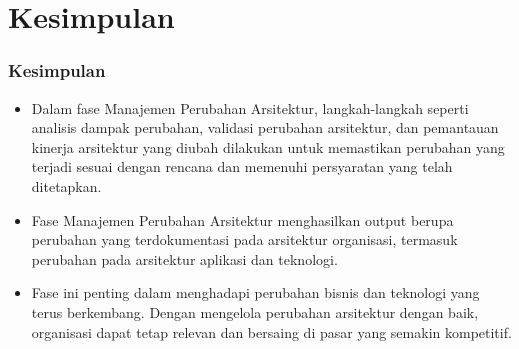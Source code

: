 \documentclass{beamer}
\begin{document}
\section{Kesimpulan}
\begin{frame}
	\frametitle{Kesimpulan}
	\begin{itemize}
	
	\item Dalam fase Manajemen Perubahan Arsitektur, langkah-langkah seperti analisis dampak perubahan, validasi perubahan arsitektur, dan pemantauan kinerja arsitektur yang diubah dilakukan untuk memastikan perubahan yang terjadi sesuai dengan rencana dan memenuhi persyaratan yang telah ditetapkan.
	
	\item Fase Manajemen Perubahan Arsitektur menghasilkan output berupa perubahan yang terdokumentasi pada arsitektur organisasi, termasuk perubahan pada arsitektur aplikasi dan teknologi.
	
	\item Fase ini penting dalam menghadapi perubahan bisnis dan teknologi yang terus berkembang. Dengan mengelola perubahan arsitektur dengan baik, organisasi dapat tetap relevan dan bersaing di pasar yang semakin kompetitif.
\end{itemize}
\end{frame}
\end{document}
